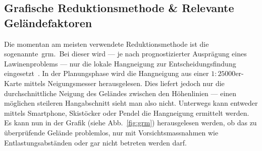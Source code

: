 
\subsection{Grafische Reduktionsmethode \& Relevante Geländefaktoren}

Die momentan am meisten verwendete Reduktionsmethode ist die sogenannte\ \acrfull{grm}.\ Bei dieser wird --- je nach prognostizierter Ausprägung eines Lawinenproblems --- nur die lokale Hangneigung zur Entscheidungsfindung eingesetzt~\cite{sacbergspwinter}. In der Planungsphase wird die Hangneigung aus einer $1:25000$er-Karte mittels Neigungsmesser herausgelesen. Dies liefert jedoch nur die durchschnittliche Neigung des Geländes zwischen den Höhenlinien --- einen möglichen steileren Hangabschnitt sieht man also nicht.
Unterwegs kann entweder mittels Smartphone, Skistöcker oder Pendel die Hangneigung ermittelt werden. Es kann nun in der Grafik (siehe Abb.\ \ref{fig:grm}) herausgelesen werden, ob das zu überprüfende Gelände problemlos, nur mit Vorsichtsmassnahmen wie Entlastungsabständen oder gar nicht betreten werden darf.

